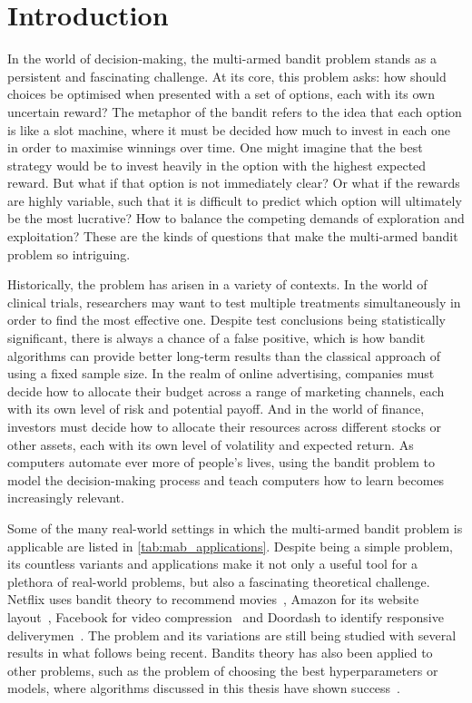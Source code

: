 \chapter{Introduction}
In the world of decision-making, the multi-armed bandit problem stands as a persistent and fascinating challenge.
At its core, this problem asks: how should choices be optimised when presented with a set of options, each with its own uncertain reward?
The metaphor of the bandit refers to the idea that each option is like a slot machine, where it must be decided how much to invest in each one in order to maximise winnings over time.
One might imagine that the best strategy would be to invest heavily in the option with the highest expected reward.
But what if that option is not immediately clear?
Or what if the rewards are highly variable, such that it is difficult to predict which option will ultimately be the most lucrative?
How to balance the competing demands of exploration and exploitation?
These are the kinds of questions that make the multi-armed bandit problem so intriguing.

Historically, the problem has arisen in a variety of contexts.
In the world of clinical trials, researchers may want to test multiple treatments simultaneously in order to find the most effective one.
Despite test conclusions being statistically significant, there is always a chance of a false positive, which is how bandit algorithms can provide better long-term results than the classical approach of using a fixed sample size.
In the realm of online advertising, companies must decide how to allocate their budget across a range of marketing channels, each with its own level of risk and potential payoff.
And in the world of finance, investors must decide how to allocate their resources across different stocks or other assets, each with its own level of volatility and expected return.
As computers automate ever more of people's lives, using the bandit problem to model the decision-making process and teach computers how to learn becomes increasingly relevant.

Some of the many real-world settings in which the multi-armed bandit problem is applicable are listed in \cref{tab:mab_applications}.
Despite being a simple problem, its countless variants and applications make it not only a useful tool for a plethora of real-world problems, but also a fascinating theoretical challenge.
Netflix uses bandit theory to recommend movies~\autocite{kawale2018}, Amazon for its website layout~\autocite{hill2017}, Facebook for video compression~\autocite{daulton2019} and Doordash to identify responsive deliverymen~\autocite{sharma2022}.
The problem and its variations are still being studied with several results in what follows being recent.
Bandits theory has also been applied to other problems, such as the problem of choosing the best hyperparameters or models, where algorithms discussed in this thesis have shown success~\autocite{gagliolo2010,wang2014,bouneffouf2017}.

